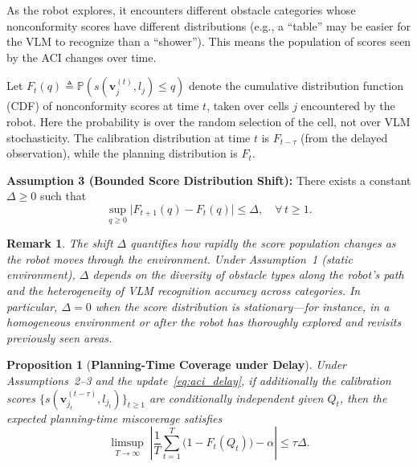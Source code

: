 \documentclass[letterpaper, 10 pt, conference]{ieeeconf}  %
\newtheorem{myprop}{\bf Proposition}
\newtheorem{remark}{Remark}
\begin{document}
As the robot explores, it encounters different obstacle categories whose nonconformity scores have different distributions (e.g., a ``table'' may be easier for the VLM to recognize than a ``shower''). This means the population of scores seen by the ACI changes over time.

Let $F_t(q) \triangleq \mathbb{P}(s(\mathbf{v}_j^{(t)}, l_j) \le q)$ denote the cumulative distribution function (CDF) of nonconformity scores at time $t$, taken over cells $j$ encountered by the robot. Here the probability is over the random selection of the cell, not over VLM stochasticity. The calibration distribution at time $t$ is $F_{t-\tau}$ (from the delayed observation), while the planning distribution is $F_t$.

\textbf{Assumption 3 (Bounded Score Distribution Shift):}
There exists a constant $\Delta \ge 0$ such that
\begin{equation}
    \sup_{q \ge 0} \bigl|F_{t+1}(q) - F_t(q)\bigr| \le \Delta, \quad \forall\, t \ge 1.
    \label{eq:score_shift}
\end{equation}

\begin{remark}
The shift $\Delta$ quantifies how rapidly the score population changes as the robot moves through the environment. Under Assumption~1 (static environment), $\Delta$ depends on the diversity of obstacle types along the robot's path and the heterogeneity of VLM recognition accuracy across categories. In particular, $\Delta = 0$ when the score distribution is stationary---for instance, in a homogeneous environment or after the robot has thoroughly explored and revisits previously seen areas.
\end{remark}

\begin{myprop}[\textbf{Planning-Time Coverage under Delay}]
\label{prop:tracking}
Under Assumptions~2--3 and the update~\eqref{eq:aci_delay}, if additionally the calibration scores $\{s(\mathbf{v}_{j_t}^{(t-\tau)}, l_{j_t})\}_{t \ge 1}$ are conditionally independent given $Q_t$, then the expected planning-time miscoverage satisfies
\begin{equation}
    \limsup_{T \to \infty}\;\left| \frac{1}{T}\sum_{t=1}^{T} \bigl(1 - F_t(Q_t)\bigr) - \alpha \right| \le \tau \Delta.
    \label{eq:tracking_bound}
\end{equation}
\end{myprop}
\end{document}
